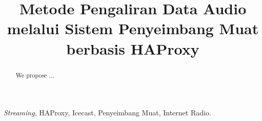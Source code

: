 \documentclass[conference]{IEEEtran}
\begin{document}
	\title{Metode Pengaliran Data Audio melalui Sistem Penyeimbang Muat berbasis HAProxy}
\author{
    }
	
\maketitle
\begin{abstract}
    We propose ...
\end{abstract}
\begin{IEEEkeywords}
    \textit{Streaming}, HAProxy, Icecast, Penyeimbang Muat, Internet Radio.
\end{IEEEkeywords}


	






	
\end{document}
